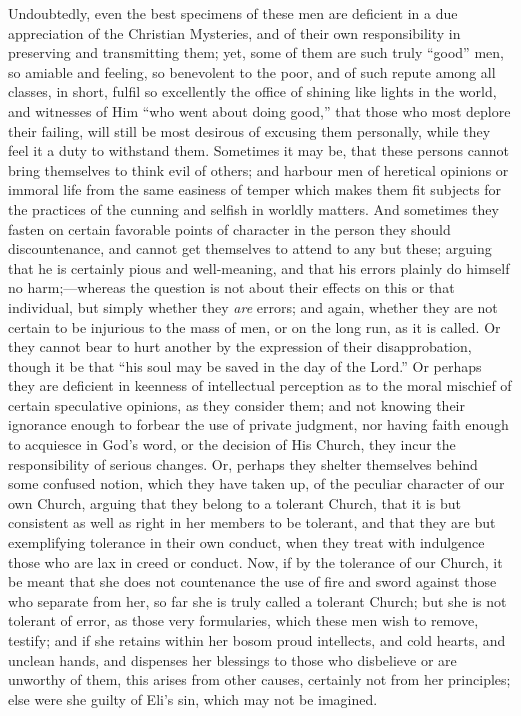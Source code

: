 Undoubtedly, even the best specimens of these men are deficient in a
due appreciation of the Christian Mysteries, and of their own
responsibility in preserving and transmitting them; yet, some of them
are such truly ``good'' men, so amiable and feeling, so
benevolent to the poor, and of such repute among all classes, in short,
fulfil so excellently the office of shining like lights in the world,
and witnesses of Him ``who went about doing good,'' that those
who most deplore their failing, will still be most desirous of excusing
them personally, while they feel it a duty to withstand them. Sometimes
it may be, that these persons cannot bring themselves to think evil of
others; and harbour men of heretical opinions or immoral life from the
same easiness of temper which makes them fit subjects for the practices
of the cunning and selfish in worldly matters. And sometimes they fasten
on certain favorable points of character in the person they should
discountenance, and cannot get themselves to attend to any but these;
arguing that he is certainly pious and well-meaning, and that his errors
plainly do himself no harm;—whereas the question is not about their
effects on this or that individual, but simply whether they \emph{are}
errors; and again, whether they are not certain to be injurious to the
mass of men, or on the long run, as it is called. Or they cannot bear to
hurt another by the expression of their disapprobation, though it be
that ``his soul may be saved in the day of the Lord.'' Or
perhaps they are deficient in keenness of intellectual perception as to
the moral mischief of certain speculative opinions, as they consider
them; and not knowing their ignorance enough to forbear the use of
private judgment, nor having faith enough to acquiesce in God's word, or
the decision of His Church, they incur the responsibility of serious
changes. Or, perhaps they shelter themselves behind some confused
notion, which they have taken up, of the peculiar character of our own
Church, arguing that they belong to a tolerant Church, that it is but
consistent as well as right in her members to be tolerant, and that they
are but exemplifying tolerance in their own conduct, when they treat
with indulgence those who are lax in creed or conduct. Now, if by the
tolerance of our Church, it be meant that she does not countenance the
use of fire and sword against those who separate from her, so far she is
truly called a tolerant Church; but she is not tolerant of error, as
those very formularies, which these men wish to remove, testify; and if
she retains within her bosom proud intellects, and cold hearts, and
unclean hands, and dispenses her blessings to those who disbelieve or
are unworthy of them, this arises from other causes, certainly not from
her principles; else were she guilty of Eli's sin, which may not be
imagined.

